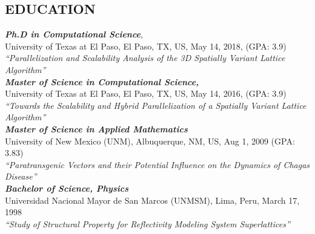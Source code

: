 \documentclass[margin]{res}
\begin{document}
\begin{resume}


  
\section{EDUCATION} %
{\sl \bf Ph.D in Computational Science}, \\
University of Texas at El Paso, El Paso, TX, US, May 14, 2018, (GPA: 3.9) \\
\textit{``Parallelization and Scalability Analysis of the 3D Spatially Variant Lattice Algorithm''}\\
%
{\sl \bf Master of Science in Computational Science,} \\
University of Texas at El Paso, El Paso, TX, US, May 14, 2016, (GPA: 3.9) \\
\textit{``Towards the Scalability and Hybrid Parallelization of a Spatially Variant Lattice Algorithm''}\\
%
{\sl \bf Master of Science in Applied Mathematics}\\
University of New Mexico (UNM), Albuquerque, NM, US, Aug 1, 2009 (GPA: 3.83) \\
\textit{``Paratransgenic Vectors and their Potential Influence on the Dynamics of Chagas Disease''} \\    
%
{\sl\bf Bachelor of Science, Physics}\\
Universidad Nacional Mayor de San Marcos (UNMSM), Lima, Peru, March 17, 1998\\
\textit{``Study of Structural Property for Reflectivity Modeling System Superlattices''}   


\end{resume}
\end{document}
